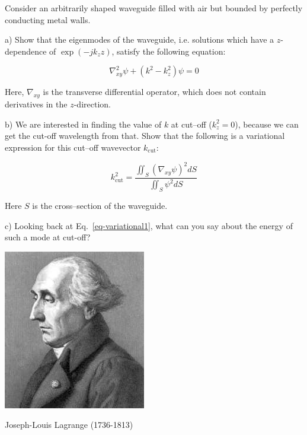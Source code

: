\begin{exer}
  
  Consider an arbitrarily shaped waveguide filled with air but bounded by perfectly conducting metal walls.

  a) Show that the eigenmodes of the waveguide, i.e. solutions which have a $z$-dependence of $\exp{(-j k_z z)}$, satisfy the following equation:

$$ \nabla_{xy}^2 \psi + \left( k^2 - k_z^2 \right)\psi = 0 $$ 

Here, $\nabla_{xy}$ is the transverse differential operator, which does not contain derivatives in the $z$-direction.

\noindent{} b) We are interested in finding the value of $k$ at cut--off ($k_z^2=0$), because we can get the cut-off wavelength from that. Show that the following is a variational expression for this cut--off wavevector $k_{\mathrm{cut}}$:

$$ k_{\mathrm{cut}}^2 = \frac{\iint_S (\nabla_{xy} \psi)^2 dS}{\iint_S \psi^2 dS}$$

Here $S$ is the cross--section of the waveguide.

c) Looking back at Eq.~\ref{eq-variational1}, what can you say about the energy of such a mode at cut-off?

\end{exer}



\begin{marginfigure}[1.0cm]
  \includegraphics{numeric/figures/j_lagrange}
  \caption{Joseph-Louis Lagrange (1736-1813)}
\end{marginfigure}


